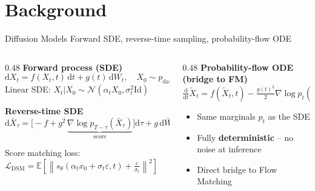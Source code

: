 \documentclass[10pt,aspectratio=169]{beamer}
\newcommand{\E}{\mathbb{E}}
\newcommand{\cN}{\mathcal{N}}
\newcommand{\cL}{\mathcal{L}}
\newcommand{\dd}{\mathrm{d}}
\newcommand{\Id}{\mathrm{Id}}
\begin{document}
\section{Background}
\begin{frame}{Diffusion Models}
  {Forward SDE, reverse-time sampling, probability-flow ODE}

  \begin{columns}[t]
    \begin{column}{0.48\textwidth}
      \textcolor{TitleColor}{\bfseries Forward process (SDE)}
      \[
        \dd X_t = f(X_t,t)\,\dd t + g(t)\,\dd W_t,
        \quad X_0 \sim p_{\mathrm{data}}
      \]
      Linear SDE: $X_t|X_0\sim\cN(\alpha_t X_0,\sigma_t^2\Id)$

      \vspace{0.35em}
      \textcolor{TitleColor}{\bfseries Reverse-time SDE}
      \[
        \dd\bar{X}_\tau = \!\Big[-f+g^2\,
          \underbrace{\nabla\!\log p_{T-\tau}(\bar{X}_\tau)}_{\text{score}}
        \Big]\dd\tau + g\,\dd\bar{W}_\tau
      \]
      \begin{hlbox}
        \small Score matching loss:
        $\cL_{\mathrm{DSM}} = \E\!\left[
          \left\|s_\theta(\alpha_t x_0+\sigma_t\varepsilon,t)
            +\tfrac{\varepsilon}{\sigma_t}\right\|^2\right]$
      \end{hlbox}
    \end{column}
    \begin{column}{0.48\textwidth}
      \textcolor{TitleColor}{\bfseries Probability-flow ODE \textnormal{\small(bridge to FM)}}
      \[
        \tfrac{\dd}{\dd t}\tilde{X}_t
          = f(\tilde{X}_t,t) - \tfrac{g(t)^2}{2}\nabla\!\log p_t(\tilde{X}_t)
      \]
      \begin{itemize}
        \item Same marginals $p_t$ as the SDE
        \item Fully \textbf{deterministic} -- no noise at inference
        \item Direct bridge to Flow Matching
      \end{itemize}
      \vspace{0.4em}
    \end{column}
  \end{columns}
\end{frame}
\end{document}

